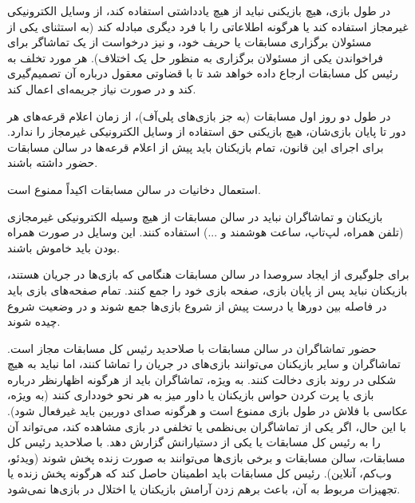 
در طول بازی، هیچ بازیکنی نباید از هیچ یادداشتی استفاده کند، از وسایل الکترونیکی غیرمجاز استفاده کند یا هرگونه اطلاعاتی را با فرد دیگری مبادله کند (به استثنای یکی از مسئولان برگزاری مسابقات یا حریف خود، و نیز درخواست از یک تماشاگر برای فراخواندن یکی از مسئولان برگزاری به منظور حل یک اختلاف). هر مورد تخلف به رئیس کل مسابقات ارجاع داده خواهد شد تا با قضاوتی معقول درباره آن تصمیم‌گیری کند و در صورت نیاز جریمه‌ای اعمال کند.

در طول دو روز اول مسابقات (به جز بازی‌های پلی‌آف)، از زمان اعلام قرعه‌های هر دور تا پایان بازی‌شان، هیچ بازیکنی حق استفاده از وسایل الکترونیکی غیرمجاز را ندارد. برای اجرای این قانون، تمام بازیکنان باید پیش از اعلام قرعه‌ها در سالن مسابقات حضور داشته باشند.


استعمال دخانیات در سالن مسابقات اکیداً ممنوع است.


بازیکنان و تماشاگران نباید در سالن مسابقات از هیچ وسیله الکترونیکی غیرمجازی (تلفن همراه، لپ‌تاپ، ساعت هوشمند و ...) استفاده کنند. این وسایل در صورت همراه بودن باید خاموش باشند.


برای جلوگیری از ایجاد سروصدا در سالن مسابقات هنگامی که بازی‌ها در جریان هستند، بازیکنان نباید پس از پایان بازی، صفحه بازی خود را جمع کنند. تمام صفحه‌های بازی باید در فاصله بین دورها یا درست پیش از شروع بازی‌ها جمع شوند و در وضعیت شروع چیده شوند.


حضور تماشاگران در سالن مسابقات با صلاحدید رئیس کل مسابقات مجاز است. تماشاگران و سایر بازیکنان می‌توانند بازی‌های در جریان را تماشا کنند، اما نباید به هیچ شکلی در روند بازی دخالت کنند. به ویژه، تماشاگران باید از هرگونه اظهارنظر درباره بازی یا پرت کردن حواس بازیکنان یا داور میز به هر نحو خودداری کنند (به ویژه، عکاسی با فلاش در طول بازی ممنوع است و هرگونه صدای دوربین باید غیرفعال شود). با این حال، اگر یکی از تماشاگران بی‌نظمی یا تخلفی در بازی مشاهده کند، می‌تواند آن را به رئیس کل مسابقات یا یکی از دستیارانش گزارش دهد. با صلاحدید رئیس کل مسابقات، سالن مسابقات و برخی بازی‌ها می‌توانند به صورت زنده پخش شوند (ویدئو، وب‌کم، آنلاین). رئیس کل مسابقات باید اطمینان حاصل کند که هرگونه پخش زنده یا تجهیزات مربوط به آن، باعث برهم زدن آرامش بازیکنان یا اختلال در بازی‌ها نمی‌شود.
